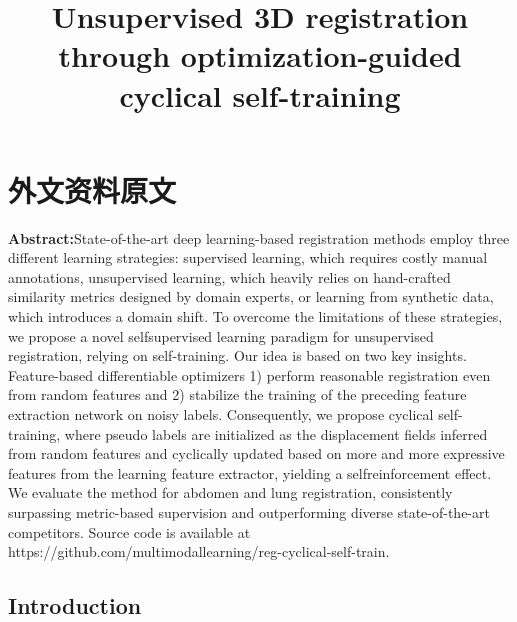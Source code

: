 

\chapter{外文资料原文}
\label{cha:engorg}

\title{Unsupervised 3D registration through optimization-guided cyclical self-training}

\textbf{Abstract:}State-of-the-art deep learning-based registration methods employ three different learning strategies: supervised learning, which requires costly manual annotations, unsupervised learning, which heavily relies on hand-crafted similarity metrics designed by domain experts, or learning from synthetic data, which introduces a domain shift. To overcome the limitations of these strategies, we propose a novel selfsupervised learning paradigm for unsupervised registration, relying on self-training. Our idea is based on two key insights. Feature-based differentiable optimizers 1) perform reasonable registration even from random features and 2) stabilize the training of the preceding feature extraction network on noisy labels. Consequently, we propose cyclical self-training, where pseudo labels are initialized as the displacement fields inferred from random features and cyclically updated based on more and more expressive features from the learning feature extractor, yielding a selfreinforcement effect. We evaluate the method for abdomen and lung registration, consistently surpassing metric-based supervision and outperforming diverse state-of-the-art competitors. Source code is available at https://github.com/multimodallearning/reg-cyclical-self-train.

\section{Introduction}


